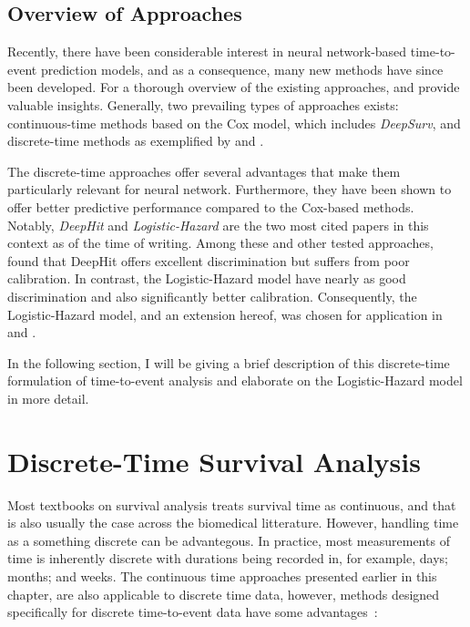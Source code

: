 \subsection{Overview of Approaches}

Recently, there have been considerable interest in neural network-based
time-to-event prediction models, and as a consequence, many new methods 
have since been developed.
For a thorough overview of the existing approaches, 
\textcite{wiegrebeDeep2023} and 
\textcite{kvammeContinuous2021} provide valuable insights.
Generally, two prevailing types of approaches exists:
continuous-time methods based on the Cox model, 
which includes \emph{DeepSurv},
and discrete-time methods as exemplified by 
\textcite{leeDeepHit2018} and \textcite{gensheimerScalable2019}.

The discrete-time approaches offer several advantages that 
make them particularly relevant for neural network. 
Furthermore, they have been shown to offer better predictive
performance compared to the Cox-based methods.
~\autocite{kvammeContinuous2021, leeDeepHit2018, gensheimerScalable2019}
Notably, \emph{DeepHit}\autocite{leeDeepHit2018}
and \emph{Logistic-Hazard}\autocite{gensheimerScalable2019}
are the two most cited papers in this context as of the time of writing.
Among these and other tested approaches,
\textcite{kvammeContinuous2021} found that 
DeepHit offers excellent discrimination but suffers from poor calibration.
In contrast, the Logistic-Hazard model have nearly as good discrimination
and also significantly better calibration. 
Consequently, the Logistic-Hazard model, and an extension hereof, 
was chosen for application in 
 and .

In the following section, I will be giving a brief description of
this discrete-time formulation of time-to-event analysis and 
elaborate on the Logistic-Hazard model in more detail.

\section{Discrete-Time Survival Analysis}

Most textbooks on survival analysis treats survival time as continuous, 
and that is also usually the case across the biomedical litterature.
However, handling time as a something discrete can be advantegous.
In practice, most measurements of time is inherently discrete 
with durations being recorded in, for example, days; months; and weeks.
The continuous time approaches presented earlier in this chapter, 
are also applicable to discrete time data,
however, methods designed specifically for discrete time-to-event 
data have some advantages~\autocite{tutzModeling2016}:

